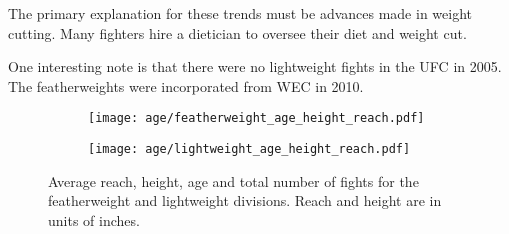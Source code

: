 The primary explanation for these trends must be advances made in
weight cutting. Many fighters hire a dietician to oversee their
diet and weight cut.

One interesting note is that there were no lightweight fights in the UFC
in 2005. The featherweights were incorporated from WEC in 2010.

\begin{figure}[h]
\begin{center}
\begin{subfigure}{8cm}
\texttt{[image: age/featherweight\_age\_height\_reach.pdf]}
\end{subfigure}
\begin{subfigure}{8cm}
\texttt{[image: age/lightweight\_age\_height\_reach.pdf]}
\end{subfigure}
\caption{Average reach, height, age and total number
of fights
for the featherweight and lightweight divisions.
Reach and height are in units of inches.}
\label{reach_vs_time_light}
\end{center}
\end{figure}

\clearpage
